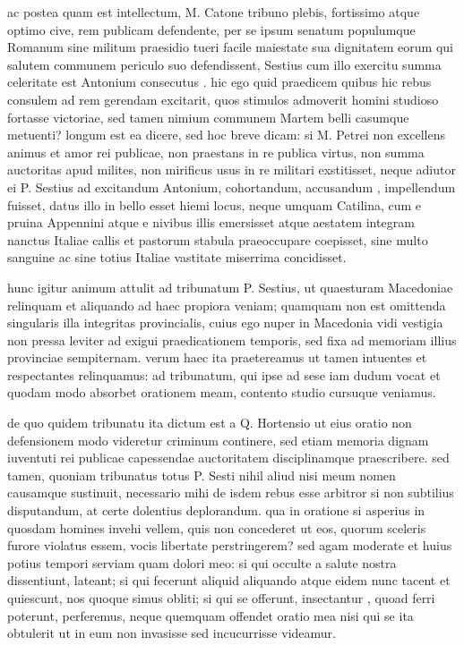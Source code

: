  ac postea quam est intellectum, M. Catone tribuno plebis, fortissimo atque optimo cive, rem publicam defendente, per se ipsum senatum populumque Romanum sine militum praesidio tueri facile maiestate sua dignitatem eorum qui salutem communem periculo suo defendissent, Sestius cum illo exercitu summa celeritate est Antonium consecutus . hic ego quid praedicem quibus hic rebus consulem ad rem gerendam excitarit, quos stimulos admoverit homini studioso fortasse victoriae, sed tamen nimium communem Martem belli casumque metuenti? longum est ea dicere, sed hoc breve dicam: si M. Petrei non excellens animus et amor rei publicae, non praestans in re publica virtus, non summa auctoritas apud milites, non mirificus usus in re militari exstitisset, neque adiutor ei P. Sestius ad excitandum Antonium, cohortandum, accusandum , impellendum fuisset, datus illo in bello esset hiemi locus, neque umquam Catilina, cum e pruina Appennini atque e nivibus illis emersisset atque aestatem integram nanctus Italiae callis et pastorum stabula praeoccupare coepisset, sine multo sanguine ac sine totius Italiae vastitate miserrima concidisset.

 hunc igitur animum attulit ad tribunatum P. Sestius, ut quaesturam Macedoniae relinquam et aliquando ad haec propiora veniam; quamquam non est omittenda singularis illa integritas provincialis, cuius ego nuper in Macedonia vidi vestigia non pressa leviter ad exigui praedicationem temporis, sed fixa ad memoriam illius provinciae sempiternam. verum haec ita praetereamus ut tamen intuentes et respectantes relinquamus: ad tribunatum, qui ipse ad sese iam dudum vocat et quodam modo absorbet orationem meam, contento studio cursuque veniamus.

 de quo quidem tribunatu ita dictum est a Q. Hortensio ut eius oratio non defensionem modo videretur criminum continere, sed etiam memoria dignam iuventuti rei publicae capessendae auctoritatem disciplinamque praescribere. sed tamen, quoniam tribunatus totus P. Sesti nihil aliud nisi meum nomen causamque sustinuit, necessario mihi de isdem rebus esse arbitror si non subtilius disputandum, at certe dolentius deplorandum. qua in oratione si asperius in quosdam homines invehi vellem, quis non concederet ut eos, quorum sceleris furore violatus essem, vocis libertate perstringerem? sed agam moderate et huius potius tempori serviam quam dolori meo: si qui occulte a salute nostra dissentiunt, lateant; si qui fecerunt aliquid aliquando atque eidem nunc tacent et quiescunt, nos quoque simus obliti; si qui se offerunt, insectantur , quoad ferri poterunt, perferemus, neque quemquam offendet oratio mea nisi qui se ita obtulerit ut in eum non invasisse sed incucurrisse videamur.

